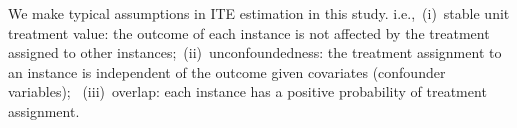We make typical assumptions in ITE estimation in this study. i.e.,~({\rm i})~stable unit treatment value: the outcome of each instance is not affected by the treatment assigned to other instances;~({\rm ii})~unconfoundedness: the treatment assignment to an instance is independent of the outcome given covariates (confounder variables); ~({\rm iii})~overlap: each instance has a positive probability of treatment assignment.

